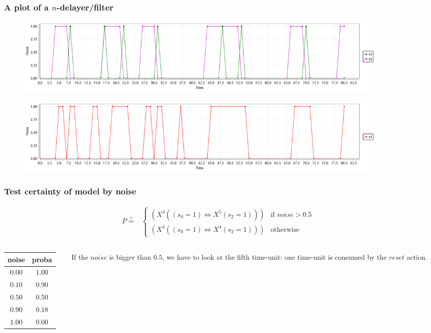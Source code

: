 \begin{frame}
  \frametitle{A plot of a $n$-delayer/filter}

  \begin{figure}
    \includegraphics[width=0.9\textwidth]{pic/simple_serie_corr_plot.png}
  \end{figure}

  \begin{figure}
    \includegraphics[width=0.9\textwidth]{pic/simple_serie_corr_plot_s1.png}
  \end{figure}

\end{frame}

\begin{frame}
  \frametitle{Test certainty of model by noise}
  \begin{align*}
    P \stackrel{?}{=} &
    \begin{cases}
      (X^4 ((s_0=1) \Leftrightarrow X^5 (s_2=1))) & \text{if } noise > 0.5 \\
      (X^4 ((s_0=1) \Leftrightarrow X^4 (s_2=1))) & \text{otherwise}
    \end{cases}
  \end{align*}



  \begin{columns}
    \begin{column}{0.35\textwidth}
      \begin{table}[]
        \begin{tabular}{cc}
          noise  & proba  \\ \hline
          $0.00$ & $1.00$ \\
          $0.10$ & $0.90$ \\
          $0.50$ & $0.50$ \\
          $0.90$ & $0.18$ \\
          $1.00$ & $0.00$
        \end{tabular}
      \end{table}
    \end{column}
    \begin{column}{0.55\textwidth}  %
      \begin{remark}
        If the $noise$ is bigger than $0.5$, we have to look at the fifth time-unit: one time-unit is consumed by the $reset$ action.
      \end{remark}
    \end{column}
  \end{columns}

\end{frame}